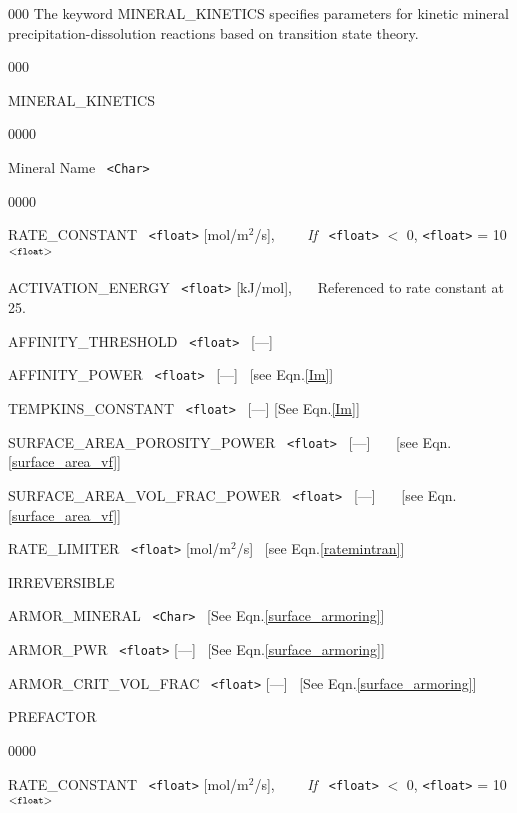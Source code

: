 \begin{deflist}{000}
The keyword MINERAL\_KINETICS specifies parameters for kinetic mineral precipitation-dissolution reactions based on transition state theory.

\hfill\hyperlink{target_key}{\return}

\begin{deflist}{000}
\item[MINERAL\_KINETICS] ~
\begin{deflist}{0000}
\item [Mineral Name]  \ {\tt <Char>}
\begin{deflist}{0000}
\item [RATE\_CONSTANT] \ {\tt <float>} [mol/m$^2$/s], \ \ \ \ {\em If} \ {\tt <float>} $<$ 0, {\tt <float>} = 10$^{\tt <float>}$
\item [ACTIVATION\_ENERGY] \ {\tt <float>} [kJ/mol], \ \ \ Referenced to rate constant at 25\degc.
~\\
\item [AFFINITY\_THRESHOLD] \ {\tt <float>} \ [---]
\item [AFFINITY\_POWER] \ {\tt <float>} \ [---] \ [see Eqn.\eqref{Im}]
~\\
\item [TEMPKINS\_CONSTANT] \ {\tt <float>} \ [---] [See Eqn.\eqref{Im}]
~\\
\item [SURFACE\_AREA\_POROSITY\_POWER] \ {\tt <float>} \ [---] \ \ \ [see Eqn.\eqref{surface_area_vf}]
\item [SURFACE\_AREA\_VOL\_FRAC\_POWER] \ {\tt <float>} \ [---] \ \ \ [see Eqn.\eqref{surface_area_vf}]
~\\
\item [RATE\_LIMITER] \ {\tt <float>} [mol/m$^2$/s] \ [see Eqn.\eqref{ratemintran}]
~\\
\item [IRREVERSIBLE] \ 
~\\
\item[ARMOR\_MINERAL] \ {\tt <Char>} \ [See Eqn.\eqref{surface_armoring}]
\item[ARMOR\_PWR] \ {\tt <float>} [---] \ [See Eqn.\eqref{surface_armoring}]
\item[ARMOR\_CRIT\_VOL\_FRAC] \ {\tt <float>} [---] \ [See Eqn.\eqref{surface_armoring}]
~\\
\item [PREFACTOR] ~
\begin{deflist}{0000}
\item [RATE\_CONSTANT] \ {\tt <float>} [mol/m$^2$/s], \ \ \ \ {\em If} \ {\tt <float>} $<$ 0, {\tt <float>} = 10$^{\tt <float>}$

\end{deflist}
\end{deflist}
\end{deflist}
\end{deflist}
\end{deflist}
